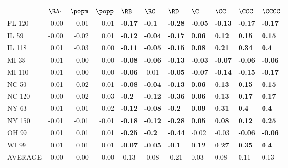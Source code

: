 \begin{tabular}{lrrrlllllll}
\toprule
{} &  $\RA_1$ &  $\popm$ &  $\popp$ &           $\RB$ &           $\RC$ &           $\RD$ &            $\C$ &           $\CC$ &          $\CCC$ &         $\CCCC$ \\
\midrule
FL 120  &    -0.00 &    -0.01 &     0.01 &  \textbf{-0.17} &   \textbf{-0.1} &  \textbf{-0.28} &  \textbf{-0.05} &  \textbf{-0.13} &  \textbf{-0.17} &  \textbf{-0.17} \\
IL 59   &    -0.00 &    -0.02 &     0.01 &  \textbf{-0.12} &  \textbf{-0.04} &  \textbf{-0.17} &   \textbf{0.06} &   \textbf{0.12} &   \textbf{0.15} &   \textbf{0.15} \\
IL 118  &     0.01 &    -0.03 &     0.00 &  \textbf{-0.11} &  \textbf{-0.05} &  \textbf{-0.15} &   \textbf{0.08} &   \textbf{0.21} &   \textbf{0.34} &    \textbf{0.4} \\
MI 38   &    -0.01 &    -0.00 &    -0.00 &  \textbf{-0.08} &  \textbf{-0.06} &  \textbf{-0.13} &  \textbf{-0.03} &  \textbf{-0.07} &  \textbf{-0.06} &  \textbf{-0.06} \\
MI 110  &     0.01 &    -0.00 &     0.00 &  \textbf{-0.06} &           -0.01 &  \textbf{-0.05} &  \textbf{-0.07} &  \textbf{-0.14} &  \textbf{-0.15} &  \textbf{-0.17} \\
NC 50   &     0.01 &     0.02 &     0.01 &  \textbf{-0.08} &  \textbf{-0.04} &  \textbf{-0.13} &   \textbf{0.06} &   \textbf{0.13} &   \textbf{0.15} &   \textbf{0.15} \\
NC 120  &     0.00 &     0.02 &     0.03 &   \textbf{-0.2} &  \textbf{-0.12} &  \textbf{-0.36} &   \textbf{0.06} &   \textbf{0.13} &   \textbf{0.17} &   \textbf{0.17} \\
NY 63   &    -0.01 &    -0.01 &    -0.02 &  \textbf{-0.12} &  \textbf{-0.08} &   \textbf{-0.2} &   \textbf{0.09} &   \textbf{0.31} &    \textbf{0.4} &    \textbf{0.4} \\
NY 150  &    -0.01 &    -0.01 &    -0.01 &  \textbf{-0.18} &  \textbf{-0.12} &  \textbf{-0.28} &   \textbf{0.05} &   \textbf{0.08} &   \textbf{0.12} &   \textbf{0.25} \\
OH 99   &     0.01 &     0.01 &     0.01 &  \textbf{-0.25} &   \textbf{-0.2} &  \textbf{-0.44} &           -0.02 &           -0.03 &  \textbf{-0.06} &  \textbf{-0.06} \\
WI 99   &    -0.01 &    -0.01 &    -0.01 &  \textbf{-0.07} &  \textbf{-0.05} &   \textbf{-0.1} &   \textbf{0.12} &   \textbf{0.27} &   \textbf{0.35} &    \textbf{0.4} \\
AVERAGE &    -0.00 &    -0.00 &     0.00 &           -0.13 &           -0.08 &           -0.21 &            0.03 &            0.08 &            0.11 &            0.13 \\
\bottomrule
\end{tabular}
